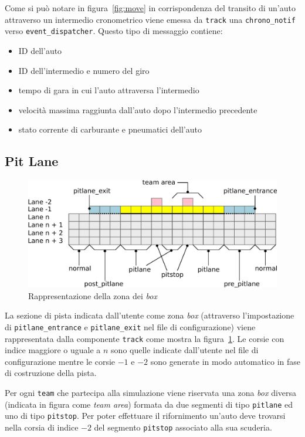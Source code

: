 \documentclass[a4paper]{report}
\begin{document}
Come si può notare in figura~\ref{fig:move} in corrispondenza del transito di un'auto attraverso un intermedio cronometrico viene emessa da \texttt{track} una \texttt{chrono\_notif} verso \texttt{event\_dispatcher}. Questo tipo di messaggio contiene:
\begin{itemize}
\item ID dell'auto
\item ID dell'intermedio e numero del giro
\item tempo di gara in cui l'auto attraversa l'intermedio
\item velocità massima raggiunta dall'auto dopo l'intermedio precedente
\item stato corrente di carburante e pneumatici dell'auto
\end{itemize}

\subsection{Pit Lane}
\begin{figure}
\includegraphics[width=\textwidth]{diagrammi/PitLane}
\caption{Rappresentazione della zona dei \textit{box}}
\label{fig:pitLane}
\end{figure}

La sezione di pista indicata dall'utente come zona \textit{box} (attraverso l'impostazione di \texttt{pitlane\_entrance} e \texttt{pitlane\_exit} nel file di configurazione) viene rappresentata dalla componente \texttt{track} come mostra la figura~\ref{fig:pitLane}. Le corsie con indice maggiore o uguale a $n$ sono quelle indicate dall'utente nel file di configurazione mentre le corsie $-1$ e $-2$ sono generate in modo automatico in fase di costruzione della pista.

Per ogni \texttt{team} che partecipa alla simulazione viene riservata una zona \textit{box} diversa (indicata in figura come \textit{team area}) formata da due segmenti di tipo \texttt{pitlane} ed uno di tipo \texttt{pitstop}. Per poter effettuare il rifornimento un'auto deve trovarsi nella corsia di indice $-2$ del segmento \texttt{pitstop} associato alla sua scuderia.
\end{document}
